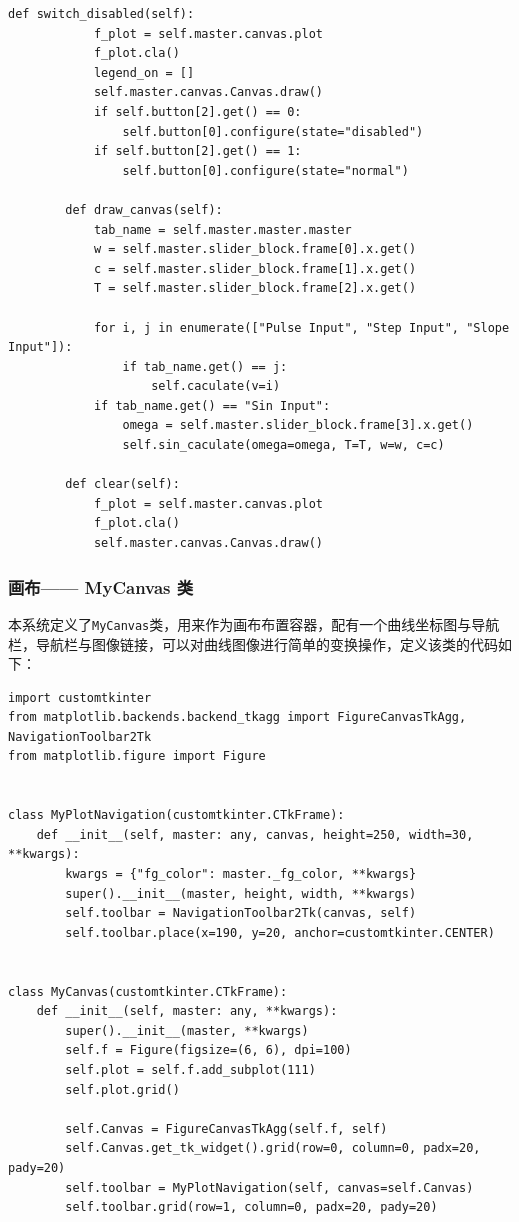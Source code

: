 \documentclass[12pt]{ctexart}
\begin{document}
\begin{lstlisting}[title=Mybutton 类代码]
        def switch_disabled(self):
            f_plot = self.master.canvas.plot
            f_plot.cla()
            legend_on = []
            self.master.canvas.Canvas.draw()
            if self.button[2].get() == 0:
                self.button[0].configure(state="disabled")
            if self.button[2].get() == 1:
                self.button[0].configure(state="normal")
    
        def draw_canvas(self):
            tab_name = self.master.master.master
            w = self.master.slider_block.frame[0].x.get()
            c = self.master.slider_block.frame[1].x.get()
            T = self.master.slider_block.frame[2].x.get()
    
            for i, j in enumerate(["Pulse Input", "Step Input", "Slope Input"]):
                if tab_name.get() == j:  
                    self.caculate(v=i)
            if tab_name.get() == "Sin Input":
                omega = self.master.slider_block.frame[3].x.get()
                self.sin_caculate(omega=omega, T=T, w=w, c=c)
    
        def clear(self):
            f_plot = self.master.canvas.plot
            f_plot.cla()
            self.master.canvas.Canvas.draw()
\end{lstlisting}

\subsubsection{画布—— MyCanvas 类}

本系统定义了\texttt{MyCanvas}类，用来作为画布布置容器，配有一个曲线坐标图与导航栏，导航栏与图像链接，可以对曲线图像进行简单的变换操作，定义该类的代码如下：

\begin{lstlisting}[title=MyCanvas 类代码]
import customtkinter
from matplotlib.backends.backend_tkagg import FigureCanvasTkAgg, NavigationToolbar2Tk
from matplotlib.figure import Figure


class MyPlotNavigation(customtkinter.CTkFrame):
    def __init__(self, master: any, canvas, height=250, width=30, **kwargs):
        kwargs = {"fg_color": master._fg_color, **kwargs}
        super().__init__(master, height, width, **kwargs)
        self.toolbar = NavigationToolbar2Tk(canvas, self)
        self.toolbar.place(x=190, y=20, anchor=customtkinter.CENTER)


class MyCanvas(customtkinter.CTkFrame):
    def __init__(self, master: any, **kwargs):
        super().__init__(master, **kwargs)
        self.f = Figure(figsize=(6, 6), dpi=100)
        self.plot = self.f.add_subplot(111)
        self.plot.grid()

        self.Canvas = FigureCanvasTkAgg(self.f, self)
        self.Canvas.get_tk_widget().grid(row=0, column=0, padx=20, pady=20)
        self.toolbar = MyPlotNavigation(self, canvas=self.Canvas)
        self.toolbar.grid(row=1, column=0, padx=20, pady=20)
\end{lstlisting}
\end{document}
